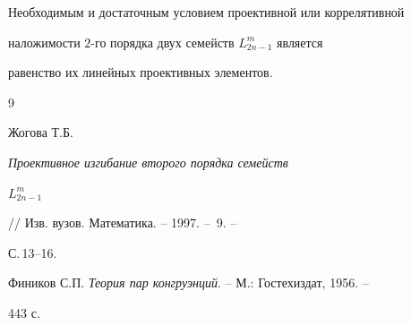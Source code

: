 \begin{thm} 


Необходимым и достаточным условием проективной или коррелятивной 


наложимости $2$-го порядка двух семейств $L^m_{2n-1}$ является 


равенство их линейных проективных элементов. 


\end{thm} 


 


\begin{thebibliography}{9} 


 




Жогова Т.Б. {\em Проективное изгибание второго порядка семейств 


$L^m_{2n-1}$} // Изв. вузов. Математика. -- 1997. -- \No\,9. -- 


С.\,13--16. 




Фиников С.П. {\em Теория пар конгруэнций}. -- М.: Гостехиздат, 1956. -- 


443 с. 


 


\end{thebibliography} 


 


\vskip 2cm 


 








\label{end} 


 


